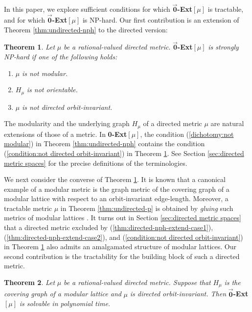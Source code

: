 \documentclass[11pt]{article}
\theoremstyle{definition}
\newtheorem{theorem}{Theorem}[section]
\begin{document}
In this paper, we explore sufficient conditions for which $\overrightarrow{\textbf{0}}$\textbf{-Ext}$[\mu]$ is tractable, and for which $\overrightarrow{\textbf{0}}$\textbf{-Ext}$[\mu]$ is NP-hard. Our first contribution is an extension of Theorem \ref{thm:undirected-nph} to the directed version:
\begin{theorem}
\label{thm:directed-nph-extend}
\textit{Let }$\mu$ \textit{be a rational-valued directed metric}. $\overrightarrow{\textbf{0}}$\textbf{-Ext}$[\mu]$ \textit{is strongly NP-hard if one of the following holds:}
\begin{enumerate}
[label=(\roman*),ref=\roman*]
    \item $\mu$ \textit{is not modular.}
    \label{thm:directed-nph-extend-case1}
    \item $H_\mu$ \textit{is not orientable.}
    \label{thm:directed-nph-extend-case2}
    \item $\mu$ \textit{is not directed orbit-invariant.}
    \label{condition:not directed orbit-invariant}
\end{enumerate}
\end{theorem}

The modularity and the underlying graph $H_\mu$ of a directed metric $\mu$ are natural extensions of those of a metric. In \textbf{0-Ext}$[\mu]$, the condition (\ref{dichotomy:not modular}) in Theorem \ref{thm:undirected-nph} contains the condition (\ref{condition:not directed orbit-invariant}) in Theorem \ref{thm:directed-nph-extend}. See Section \ref{sec:directed metric spaces} for the precise definitions of the terminologies. 

We next consider the converse of Theorem \ref{thm:directed-nph-extend}. It is known \cite{bandelt1985} that a canonical example of a modular metric is the graph metric of the covering graph of a modular lattice with respect to an orbit-invariant edge-length. Moreover, a tractable metric $\mu$ in Theorem \ref{thm:undirected-p} is obtained by \textit{gluing} such metrics of modular lattices \cite{hirai2016}. It turns out in Section \ref{sec:directed metric spaces} that a directed metric excluded by (\ref{thm:directed-nph-extend-case1}), (\ref{thm:directed-nph-extend-case2}), and (\ref{condition:not directed orbit-invariant}) in Theorem \ref{thm:directed-nph-extend} also admits an amalgamated structure of modular lattices.
Our second contribution is the tractability for the building block of such a directed metric.
\begin{theorem}
\label{thm:directed-p}
\textit{Let} $\mu$ \textit{be a rational-valued directed metric. Suppose that} $H_\mu$ \textit{is the covering graph of a modular lattice and} $\mu$ \textit{is directed orbit-invariant. Then }$\overrightarrow{\textbf{0}}$\textbf{-Ext}$[\mu]$ \textit{is solvable in polynomial time.}
\end{theorem}
\end{document}
